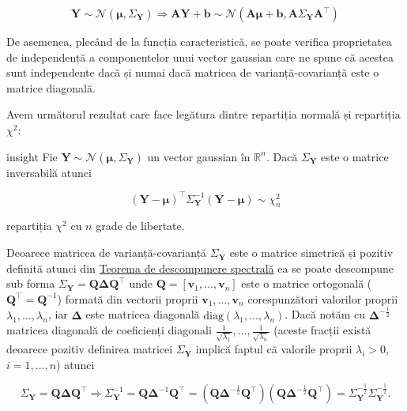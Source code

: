 \documentclass[]{article}
\newenvironment{frshaded_insight*}{%
  \def\FrameCommand{\fboxrule=\FrameRule\fboxsep=\FrameSep \fcolorbox{framecolor_insight}{shadecolor_insight}}%
  \MakeFramed {\advance\hsize-\width \FrameRestore}}%
{\endMakeFramed}
\newenvironment{rmdblock_insight}[1]
  {\begin{frshaded_insight*}
  \begin{itemize}
  \renewcommand{\labelitemi}{
    \raisebox{-.7\height}[0pt][0pt]{
      {\setkeys{Gin}{width=2em,keepaspectratio}\texttt{[image: images/icons/\#1]}}
    }
  }
  \item
  }
  {
  \end{itemize}
  \end{frshaded_insight*}
  }
\newenvironment{rmdinsight}
  {\begin{rmdblock_insight}{insight}}
  {\end{rmdblock_insight}}
\begin{document}
\[
  \boldsymbol Y \sim\mathcal{N}(\boldsymbol\mu, \Sigma_{\boldsymbol Y}) \Longrightarrow \boldsymbol A\boldsymbol Y + \boldsymbol b \sim\mathcal{N}(\boldsymbol A\boldsymbol\mu + \boldsymbol b, \boldsymbol A\Sigma_{\boldsymbol Y}\boldsymbol A^\intercal)
\]

De asemenea, plecând de la funcția caracteristică, se poate verifica
proprietatea de independență a componentelor unui vector gaussian care
ne spune că acestea sunt independente dacă și numai dacă matricea de
varianță-covarianță este o matrice diagonală.

Avem următorul rezultat care face legătura dintre repartiția normală și
repartiția \(\chi^2\):

\begin{rmdinsight}
Fie
\(\boldsymbol Y \sim\mathcal{N}(\boldsymbol\mu, \Sigma_{\boldsymbol Y})\)
un vector gaussian în \(\mathbb{R}^n\). Dacă \(\Sigma_{\boldsymbol Y}\)
este o matrice inversabilă atunci

\[
  (\boldsymbol Y - \boldsymbol \mu)^\intercal \Sigma_{\boldsymbol Y}^{-1}(\boldsymbol Y - \boldsymbol \mu) \sim \chi_n^2
\]

repartiția \(\chi^2\) cu \(n\) grade de libertate.
\end{rmdinsight}

Deoarece matricea de varianță-covarianță \(\Sigma_{\boldsymbol Y}\) este
o matrice simetrică și pozitiv definită atunci din
\href{https://en.wikipedia.org/wiki/Eigendecomposition_of_a_matrix}{Teorema
de descompunere spectrală} ea se poate descompune sub forma
\(\Sigma_{\boldsymbol Y} = \boldsymbol Q\boldsymbol\Delta \boldsymbol Q^\intercal\)
unde \(\boldsymbol Q = [\boldsymbol v_1,\ldots,\boldsymbol v_n]\) este o
matrice ortogonală (\(\boldsymbol Q^\intercal = \boldsymbol Q^{-1}\))
formată din vectorii proprii \(\boldsymbol v_1,\ldots,\boldsymbol v_n\)
corespunzători valorilor proprii \(\lambda_1,\ldots,\lambda_n\), iar
\(\boldsymbol \Delta\) este matricea diagonală
\(\mathrm{diag}(\lambda_1,\ldots,\lambda_n)\). Dacă notăm cu
\(\boldsymbol \Delta^{-\frac{1}{2}}\) matricea diagonală de coeficienți
diagonali
\(\frac{1}{\sqrt{\lambda_1}},\ldots,\frac{1}{\sqrt{\lambda_n}}\) (aceste
fracții există deoarece pozitiv definirea matricei
\(\Sigma_{\boldsymbol Y}\) implică faptul că valorile proprii
\(\lambda_i>0\), \(i = 1,\ldots,n\)) atunci

\[
\Sigma_{\boldsymbol Y} = \boldsymbol Q\boldsymbol\Delta \boldsymbol Q^\intercal \Longrightarrow \Sigma_{\boldsymbol Y}^{-1} = \boldsymbol Q\boldsymbol\Delta^{-1} \boldsymbol Q^\intercal = \left(\boldsymbol Q\boldsymbol\Delta^{-\frac{1}{2}} \boldsymbol Q^\intercal\right)\left(\boldsymbol Q\boldsymbol\Delta^{-\frac{1}{2}} \boldsymbol Q^\intercal\right) = \Sigma_{\boldsymbol Y}^{-\frac{1}{2}}\Sigma_{\boldsymbol Y}^{-\frac{1}{2}}.
\]
\end{document}
